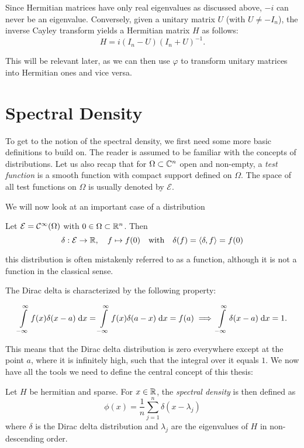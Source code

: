 Since Hermitian matrices have only real eigenvalues as discussed above, $-i$ can never be an eigenvalue. Conversely, given a unitary matrix $U$ (with $U \neq -I_n$), the inverse Cayley transform yields a Hermitian matrix $H$ as follows:
\[
H = i (I_n - U)(I_n + U)^{-1}.
\]

This will be relevant later, as we can then use $\varphi$ to transform unitary matrices into Hermitian ones and vice versa.

\section{Spectral Density}

To get to the notion of the spectral density, we first need some more basic definitions to build on. The reader is assumed to be familiar with the concepts of distributions. Let us also recap that for $\Omega \subset \mathbb{C}^n$ open and non-empty, a \emph{test function} is a smooth function with compact support defined on $\Omega$. The space of all test functions on $\Omega$ is usually denoted by $\mathcal{E}$.

We will now look at an important case of a distribution

\begin{definition}
    Let $\mathcal{E} = \mathcal{C}^{\infty}(\Omega)$ with $0 \in \Omega \subset \mathbb{R}^n$.
    Then
    \[
    \delta: \mathcal{E} \to \mathbb{R}, \quad f \mapsto f(0) \quad \text{with} \quad \delta(f) = \langle \delta, f \rangle = f(0)
    \]
\end{definition}

this distribution is often mistakenly referred to as a function, although it is not a function in the classical sense.

The Dirac delta is characterized by the following property:

\[
\int\limits_{-\infty}^{\infty} f(x) \delta(x-a) \;\mathrm{d}x = \int\limits_{-\infty}^{\infty} f(x) \delta(a-x) \;\mathrm{d}x = f(a) \implies \int\limits_{-\infty}^{\infty} \delta(x-a) \;\mathrm{d}x = 1.
\]

This means that the Dirac delta distribution is zero everywhere except at the point $a$, where it is infinitely high, such that the integral over it equals $1$. We now have all the tools we need to define the central concept of this thesis:

\begin{definition}
    Let $H$ be hermitian and sparse.
    For $x \in \mathbb{R}$, the \emph{spectral density} is then defined as
    \[
    \phi(x) = \frac{1}{n} \sum_{j=1}^{n} \delta(x - \lambda_j)
    \]
    where $\delta$ is the Dirac delta distribution
    and $\lambda_j$ are the eigenvalues of $H$ in non-descending order.
\end{definition}

